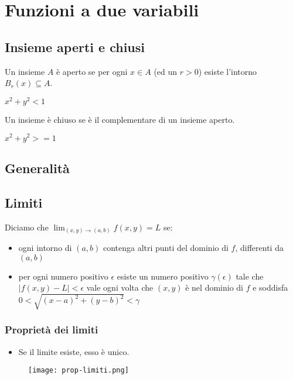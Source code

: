 \chapter{Funzioni a due variabili}

\section{Insieme aperti e chiusi}

\begin{definition}
Un insieme $A$ è aperto se per ogni $x \in A$ (ed un $r>0$) esiste l'intorno $B_r(x) \subseteq A$.
\end{definition}

\begin{example}
$x^2+y^2<1$
\end{example}

\begin{definition}
Un insieme è chiuso se è il complementare di un insieme aperto.
\end{definition}

\begin{example}
$x^2+y^2>=1$
\end{example}

\section{Generalità}

\section{Limiti}

Diciamo che $\lim_{(x,y)\to(a,b)} f(x,y) = L$ se:
\begin{itemize}
\item ogni intorno di $(a,b)$ contenga altri punti del dominio di $f$, differenti da $(a,b)$
\item per ogni numero positivo $\epsilon$ esiste un numero positivo $\gamma(\epsilon)$ tale che $|f(x,y)-L|<\epsilon$ vale ogni volta che $(x,y)$ è nel dominio di $f$ e soddisfa $0<\sqrt{(x-a)^2+(y-b)^2}<\gamma$
\end{itemize}

\subsection{Proprietà dei limiti}
\begin{itemize}
\item Se il limite esiste, esso è unico.
\end{itemize}
\begin{figure}[H]
\texttt{[image: prop-limiti.png]}
\end{figure}
